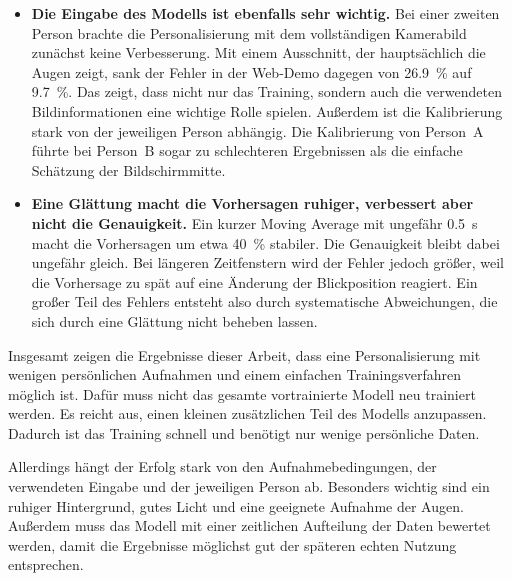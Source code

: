\begin{itemize}
{        falsche Labels enthalten.} Besonders direkt nach einem Sprung des Punkts
        stimmen die gespeicherten Blickpositionen teilweise nicht mehr mit der
        tatsächlichen Position überein. Das Entfernen dieser Bilder verbessert
        die Ergebnisse nur leicht. Trotzdem ist es sinnvoll, diese Bilder zu
        erkennen und beim Training nicht zu verwenden.
  \item \textbf{Die Eingabe des Modells ist ebenfalls sehr wichtig.} Bei einer
        zweiten Person brachte die Personalisierung mit dem vollständigen
        Kamerabild zunächst keine Verbesserung. Mit einem Ausschnitt, der
        hauptsächlich die Augen zeigt, sank der Fehler in der Web-Demo dagegen
        von \SI{26,9}{\percent} auf \SI{9,7}{\percent}. Das zeigt, dass nicht
        nur das Training, sondern auch die verwendeten Bildinformationen eine
        wichtige Rolle spielen. Außerdem ist die Kalibrierung stark von der
        jeweiligen Person abhängig. Die Kalibrierung von Person~A führte bei
        Person~B sogar zu schlechteren Ergebnissen als die einfache Schätzung
        der Bildschirmmitte.
  \item \textbf{Eine Glättung macht die Vorhersagen ruhiger, verbessert aber
        nicht die Genauigkeit.} Ein kurzer Moving Average mit ungefähr
        \SI{0,5}{\second} macht die Vorhersagen um etwa \SI{40}{\percent}
        stabiler. Die Genauigkeit bleibt dabei ungefähr gleich. Bei längeren
        Zeitfenstern wird der Fehler jedoch größer, weil die Vorhersage zu spät
        auf eine Änderung der Blickposition reagiert. Ein großer Teil des
        Fehlers entsteht also durch systematische Abweichungen, die sich durch
        eine Glättung nicht beheben lassen.
\end{itemize}

Insgesamt zeigen die Ergebnisse dieser Arbeit, dass eine Personalisierung mit
wenigen persönlichen Aufnahmen und einem einfachen Trainingsverfahren möglich
ist. Dafür muss nicht das gesamte vortrainierte Modell neu trainiert werden. Es
reicht aus, einen kleinen zusätzlichen Teil des Modells anzupassen. Dadurch ist
das Training schnell und benötigt nur wenige persönliche Daten.

Allerdings hängt der Erfolg stark von den Aufnahmebedingungen, der verwendeten
Eingabe und der jeweiligen Person ab. Besonders wichtig sind ein ruhiger
Hintergrund, gutes Licht und eine geeignete Aufnahme der Augen. Außerdem muss
das Modell mit einer zeitlichen Aufteilung der Daten bewertet werden, damit die
Ergebnisse möglichst gut der späteren echten Nutzung entsprechen.

